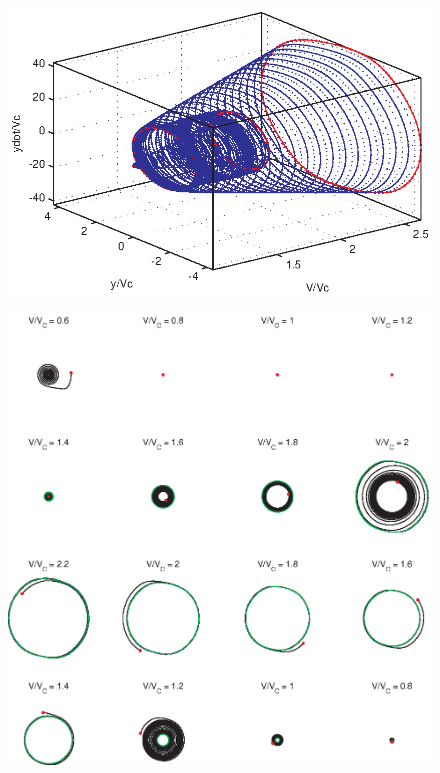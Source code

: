 \begin{figure}[htp]
\centering
\includegraphics{img/ex2/bifA3d.eps}
\caption{}
\label{fig:bifA3d}
\end{figure}

\begin{figure}[htp]
\centering
\includegraphics{img/ex2/27.eps}
\caption{}
\label{fig:ex227}
\end{figure}
